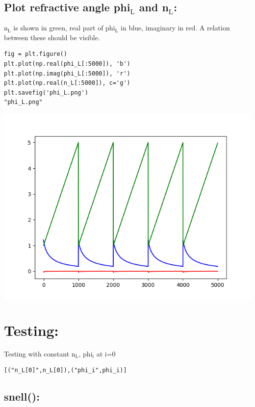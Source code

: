 \documentclass[11pt]{article}
\begin{document}
\subsection{Plot refractive angle phi\(_{\text{L}}\) and n\(_{\text{L}}\):}
\label{sec:org1adb925}

n\(_{\text{L}}\) is shown in green, real part of phi\(_{\text{L}}\) in blue, imaginary in red. 
A relation between these should be visible.

\begin{verbatim}
fig = plt.figure()
plt.plot(np.real(phi_L[:5000]), 'b')
plt.plot(np.imag(phi_L[:5000]), 'r')
plt.plot(np.real(n_L[:5000]), c='g')
plt.savefig('phi_L.png')
"phi_L.png"
\end{verbatim}

\begin{center}
\includegraphics[width=.9\linewidth]{phi_L.png}
\end{center}

\section{Testing:}
\label{sec:orgeb01dbb}

Testing with constant n\(_{\text{L}}\), phi\(_{\text{i}}\) at i=0
\begin{verbatim}
[("n_L[0]",n_L[0]),("phi_i",phi_i)]
\end{verbatim}

\subsection{snell():}
\label{sec:orge5af11a}
\end{document}
